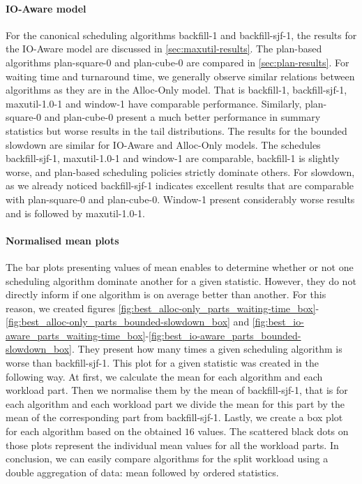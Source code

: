 \documentclass[thesis-en.tex]{subfiles}
\begin{document}
\paragraph{IO-Aware model}
For the canonical scheduling algorithms backfill-1 and backfill-sjf-1, the results for the IO-Aware model are discussed in \autoref{sec:maxutil-results}. The plan-based algorithms plan-square-0 and plan-cube-0 are compared in \autoref{sec:plan-results}. For waiting time and turnaround time, we generally observe similar relations between algorithms as they are in the Alloc-Only model. That is backfill-1,  backfill-sjf-1, maxutil-1.0-1 and window-1 have comparable performance. Similarly, plan-square-0 and plan-cube-0 present a much better performance in summary statistics but worse results in the tail distributions. The results for the bounded slowdown are similar for IO-Aware and Alloc-Only models. The schedules backfill-sjf-1, maxutil-1.0-1 and window-1 are comparable, backfill-1 is slightly worse, and plan-based scheduling policies strictly dominate others. For slowdown, as we already noticed backfill-sjf-1 indicates excellent results that are comparable with plan-square-0 and plan-cube-0. Window-1 present considerably worse results and is followed by maxutil-1.0-1.

\paragraph{Normalised mean plots}
The bar plots presenting values of mean enables to determine whether or not one scheduling algorithm dominate another for a given statistic. However, they do not directly inform if one algorithm is on average better than another. For this reason, we created figures \ref{fig:best_alloc-only_parts_waiting-time_box}-\ref{fig:best_alloc-only_parts_bounded-slowdown_box} and \ref{fig:best_io-aware_parts_waiting-time_box}-\ref{fig:best_io-aware_parts_bounded-slowdown_box}. They present how many times a given scheduling algorithm is worse than backfill-sjf-1. This plot for a given statistic was created in the following way. At first, we calculate the mean for each algorithm and each workload part. Then we normalise them by the mean of backfill-sjf-1, that is for each algorithm and each workload part we divide the mean for this part by the mean of the corresponding part from backfill-sjf-1. Lastly, we create a box plot for each algorithm based on the obtained $16$ values. The scattered black dots on those plots represent the individual mean values for all the workload parts. In conclusion, we can easily compare algorithms for the split workload using a double aggregation of data: mean followed by ordered statistics.
\end{document}
